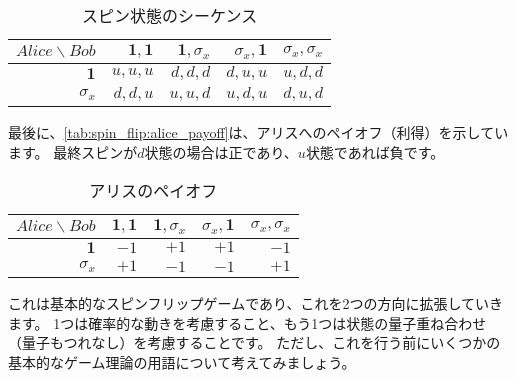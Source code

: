 \begin{table}[H]
\caption{スピン状態のシーケンス}
\label{tab:spin_flip:spin_seq}
\centering
  \begin{tabular}{|r||r|r|r|r|} \hline
    $Alice \backslash Bob$ & $\mathbf{1}, \mathbf{1}$  &  $\mathbf{1}, \sigma_x $  & $ \sigma_x,\mathbf{1} $ & $\sigma_x, \sigma_x $  \\ \hline \hline
    $\mathbf{1}$ & $u,u,u$ & $d,d,d$ & $d,u,u$ & $u,d,d$ \\
    $\sigma_x$   & $d,d,u$ & $u,u,d$ & $u,d,u$ & $d,u,d$ \\ \hline
  \end{tabular}
\end{table}

最後に、\autoref{tab:spin_flip:alice_payoff}は、アリスへのペイオフ（利得）を示しています。
最終スピンが$d$状態の場合は正であり、$u$状態であれば負です。

\begin{table}[H]
\caption{アリスのペイオフ}
\label{tab:spin_flip:alice_payoff}
\centering
  \begin{tabular}{|r||r|r|r|r|} \hline
    $Alice \backslash Bob$ & $\mathbf{1}, \mathbf{1}$  &  $\mathbf{1}, \sigma_x $  & $ \sigma_x,\mathbf{1} $ & $\sigma_x, \sigma_x $  \\ \hline \hline
    $\mathbf{1}$ & $-1$ & $+1$ & $+1$ & $-1$ \\
    $\sigma_x$   & $+1$ & $-1$ & $-1$ & $+1$ \\ \hline
  \end{tabular}
\end{table}


これは基本的なスピンフリップゲームであり、これを2つの方向に拡張していきます。
1つは確率的な動きを考慮すること、もう1つは状態の量子重ね合わせ（量子もつれなし）を考慮することです。
ただし、これを行う前にいくつかの基本的なゲーム理論の用語について考えてみましょう。
